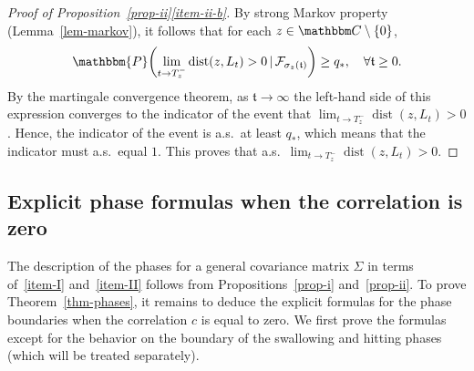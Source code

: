 \documentclass[11pt]{article}
\theoremstyle{plain}
\theoremstyle{definition}
\numberwithin{equation}{section}
\newcommand{\eqbn}{\begin{equation*}}
\newcommand{\eqen}{\end{equation*}}
\newcommand{\BB}{\mathbbm}
\newcommand{\rta}{\rightarrow}
\newcommand{\mcl}{\mathcal}
\newcommand{\dist}{{\operatorname{dist}}}
\newcommand{\tz}{{\mathfrak t}}
\let\originalleft\left
\let\originalright\right
\renewcommand{\left}{\mathopen{}\mathclose\bgroup\originalleft}
\renewcommand{\right}{\aftergroup\egroup\originalright}
\begin{document}
\begin{proof}[Proof of Proposition~{\hyperref[item-ii-b]{\ref*{prop-ii}\ref*{item-ii-b}}}]
By strong Markov property (Lemma~\ref{lem-markov}), it follows that for each $z\in\BB C\setminus \{0\}$, 
\eqbn
 \BB{P}\left(\lim_{t \rta T_z^-} \dist(z,L_t) > 0 \,|\, \mcl F_{\sigma_z(\tz)} \right) \geq q_* ,\quad \forall \tz \geq 0 . 
 \eqen
By the martingale convergence theorem, as $\tz \rta \infty$ the left-hand side of this expression converges to the indicator of the event that $\lim_{t \rta T_z^-} \dist(z,L_t) > 0$.  Hence, the indicator of the event is a.s.\ at least $q_*$, which means that the indicator must a.s.\ equal $1$. This proves that a.s.\ $\lim_{t \rta T_z^-} \dist(z,L_t) > 0$. 
\end{proof}


\subsection{Explicit phase formulas when the correlation is zero}
 
The description of the phases for a general covariance matrix $\Sigma$ in terms of~\ref{item-I} and~\ref{item-II} follows from Propositions~\ref{prop-i} and~\ref{prop-ii}.  
To prove Theorem~\ref{thm-phases}, it remains to deduce the explicit formulas for the phase boundaries when the correlation $c$ is equal to zero. We first prove the formulas except for the behavior on the boundary of the swallowing and hitting phases (which will be treated separately). 
\end{document}
